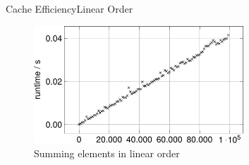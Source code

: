 %
%  
%
%
%  


\begin{frame}{Cache Efficiency}{Linear Order}
  \begin{figure}
    \begin{center}
      \includegraphics[width=0.7\textwidth]{Images/Caching/sumlinear-plot.pdf}
    \end{center}
    \caption{Summing elements in linear order}
    \label{fig:caching:sum_linear_order}
  \end{figure}
\end{frame}




